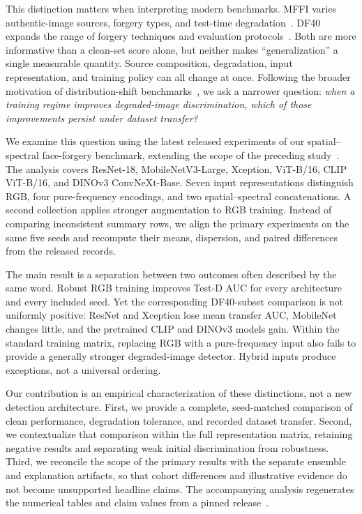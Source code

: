 \documentclass[conference,10pt,letterpaper]{IEEEtran}
\newcommand{\testd}{Test-D}
\begin{document}
This distinction matters when interpreting modern benchmarks. MFFI varies authentic-image sources, forgery types, and test-time degradation~\cite{miao2025}. DF40 expands the range of forgery techniques and evaluation protocols~\cite{yan2024df40}. Both are more informative than a clean-set score alone, but neither makes ``generalization'' a single measurable quantity. Source composition, degradation, input representation, and training policy can all change at once. Following the broader motivation of distribution-shift benchmarks~\cite{koh2021}, we ask a narrower question: \emph{when a training regime improves degraded-image discrimination, which of those improvements persist under dataset transfer?}

We examine this question using the latest released experiments of our spatial--spectral face-forgery benchmark, extending the scope of the preceding study~\cite{cunha2026}. The analysis covers ResNet-18, MobileNetV3-Large, Xception, ViT-B/16, CLIP ViT-B/16, and DINOv3 ConvNeXt-Base. Seven input representations distinguish RGB, four pure-frequency encodings, and two spatial--spectral concatenations. A second collection applies stronger augmentation to RGB training. Instead of comparing inconsistent summary rows, we align the primary experiments on the same five seeds and recompute their means, dispersion, and paired differences from the released records.

The main result is a separation between two outcomes often described by the same word. Robust RGB training improves \testd{} AUC for every architecture and every included seed. Yet the corresponding DF40-subset comparison is not uniformly positive: ResNet and Xception lose mean transfer AUC, MobileNet changes little, and the pretrained CLIP and DINOv3 models gain. Within the standard training matrix, replacing RGB with a pure-frequency input also fails to provide a generally stronger degraded-image detector. Hybrid inputs produce exceptions, not a universal ordering.

Our contribution is an empirical characterization of these distinctions, not a new detection architecture. First, we provide a complete, seed-matched comparison of clean performance, degradation tolerance, and recorded dataset transfer. Second, we contextualize that comparison within the full representation matrix, retaining negative results and separating weak initial discrimination from robustness. Third, we reconcile the scope of the primary results with the separate ensemble and explanation artifacts, so that cohort differences and illustrative evidence do not become unsupported headline claims. The accompanying analysis regenerates the numerical tables and claim values from a pinned release~\cite{release2026}.
\end{document}
